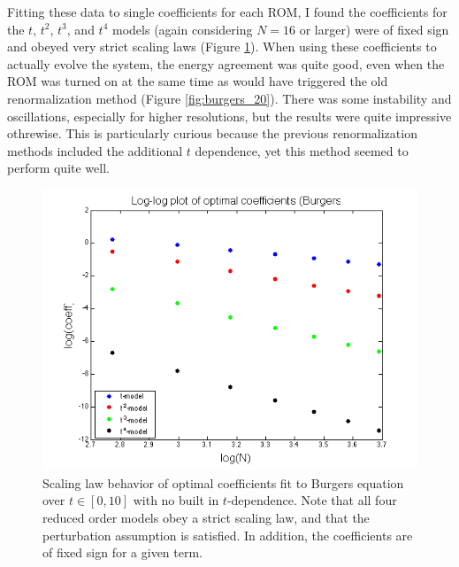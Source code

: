 \documentclass{article}
\begin{document}
Fitting these data to single coefficients for each ROM, I found the coefficients for the $t$, $t^2$, $t^3$, and $t^4$ models (again considering $N=16$ or larger) were of fixed sign and obeyed very strict scaling laws (Figure \ref{fig:burgers_loglog}). When using these coefficients to actually evolve the system, the energy agreement was quite good, even when the ROM was turned on at the same time as would have triggered the old renormalization method (Figure \ref{fig:burgers_20}). There was some instability and oscillations, especially for higher resolutions, but the results were quite impressive othrewise. This is particularly curious because the previous renormalization methods included the additional $t$ dependence, yet this method seemed to perform quite well.

\begin{figure}[h]
\includegraphics[width=\textwidth]{burgers_loglog.png}
\caption{Scaling law behavior of optimal coefficients fit to Burgers equation over $t\in[0,10]$ with no built in $t$-dependence. Note that all four reduced order models obey a strict scaling law, and that the perturbation assumption is satisfied. In addition, the coefficients are of fixed sign for a given term.}\label{fig:burgers_loglog}
\end{figure}
\end{document}
